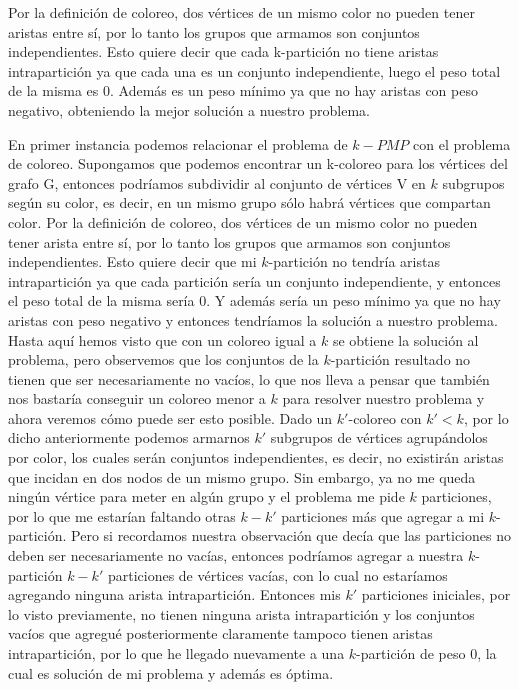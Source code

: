 Por la definición de coloreo, dos vértices de un mismo color no pueden tener aristas entre sí, por lo tanto los grupos que armamos son conjuntos independientes. Esto quiere decir que cada k-partición no tiene aristas intrapartición ya que cada una es un conjunto independiente, luego el peso total de la misma es $0$. Además es un peso mínimo ya que no hay aristas con peso negativo, obteniendo la mejor solución a nuestro problema.


En primer instancia podemos relacionar el problema de $k-PMP$ con el problema de coloreo. Supongamos que podemos encontrar un k-coloreo para los vértices del grafo G, entonces podríamos subdividir al conjunto de vértices V en $k$ subgrupos según su color, es decir, en un mismo grupo sólo habrá vértices que compartan color. Por la definición de coloreo, dos vértices de un mismo color no pueden tener arista entre sí, por lo tanto los grupos que armamos son conjuntos independientes. Esto quiere decir que mi $k$-partición no tendría aristas intrapartición ya que cada partición sería un conjunto independiente, y entonces el peso total de la misma sería $0$. Y además sería un peso mínimo ya que no hay aristas con peso negativo y entonces tendríamos la solución a nuestro problema. Hasta aquí hemos visto que con un coloreo igual a $k$ se obtiene la solución al problema, pero observemos que los conjuntos de la $k$-partición resultado no tienen que ser necesariamente no vacíos, lo que nos lleva a pensar que también nos bastaría conseguir un coloreo menor a $k$ para resolver nuestro problema y ahora veremos cómo puede ser esto posible. Dado un $k'$-coloreo con $k'<k$, por lo dicho anteriormente podemos armarnos $k'$ subgrupos de vértices agrupándolos por color, los cuales serán conjuntos independientes, es decir, no existirán aristas que incidan en dos nodos de un mismo grupo. Sin embargo, ya no me queda ningún vértice para meter en algún grupo y el problema me pide $k$ particiones, por lo que me estarían faltando otras $k-k'$ particiones más que agregar a mi $k$-partición. Pero si recordamos nuestra observación que decía que las particiones no deben ser necesariamente no vacías, entonces podríamos agregar a nuestra $k$-partición $k-k'$ particiones de vértices vacías, con lo cual no estaríamos agregando ninguna arista intrapartición. Entonces mis $k'$ particiones iniciales, por lo visto previamente, no tienen ninguna arista intrapartición y los conjuntos vacíos que agregué posteriormente claramente tampoco tienen aristas intrapartición, por lo que he llegado nuevamente a una $k$-partición de peso $0$, la cual es solución de mi problema y además es óptima.

